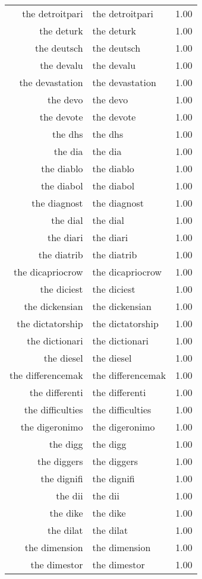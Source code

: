 \begin{table}[ht]
\begin{tabular}{rlr}
  the detroitpari & the detroitpari & 1.00 \\ 
  the deturk & the deturk & 1.00 \\ 
  the deutsch & the deutsch & 1.00 \\ 
  the devalu & the devalu & 1.00 \\ 
  the devastation & the devastation & 1.00 \\ 
  the devo & the devo & 1.00 \\ 
  the devote & the devote & 1.00 \\ 
  the dhs & the dhs & 1.00 \\ 
  the dia & the dia & 1.00 \\ 
  the diablo & the diablo & 1.00 \\ 
  the diabol & the diabol & 1.00 \\ 
  the diagnost & the diagnost & 1.00 \\ 
  the dial & the dial & 1.00 \\ 
  the diari & the diari & 1.00 \\ 
  the diatrib & the diatrib & 1.00 \\ 
  the dicapriocrow & the dicapriocrow & 1.00 \\ 
  the diciest & the diciest & 1.00 \\ 
  the dickensian & the dickensian & 1.00 \\ 
  the dictatorship & the dictatorship & 1.00 \\ 
  the dictionari & the dictionari & 1.00 \\ 
  the diesel & the diesel & 1.00 \\ 
  the differencemak & the differencemak & 1.00 \\ 
  the differenti & the differenti & 1.00 \\ 
  the difficulties & the difficulties & 1.00 \\ 
  the digeronimo & the digeronimo & 1.00 \\ 
  the digg & the digg & 1.00 \\ 
  the diggers & the diggers & 1.00 \\ 
  the dignifi & the dignifi & 1.00 \\ 
  the dii & the dii & 1.00 \\ 
  the dike & the dike & 1.00 \\ 
  the dilat & the dilat & 1.00 \\ 
  the dimension & the dimension & 1.00 \\ 
  the dimestor & the dimestor & 1.00 \\ 

\end{tabular}
\end{table}
